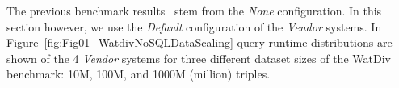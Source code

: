%
%
The previous benchmark results~\cite{de2016big} stem from the \emph{None} configuration. In this section however, we use the \emph{Default} configuration of the \emph{Vendor} systems.
In Figure~\ref{fig:Fig01_WatdivNoSQLDataScaling} query runtime distributions are shown of the 4 \emph{Vendor} systems for three different dataset sizes of the WatDiv benchmark: 10M, 100M, and 1000M (million) triples.
%
%
%  


